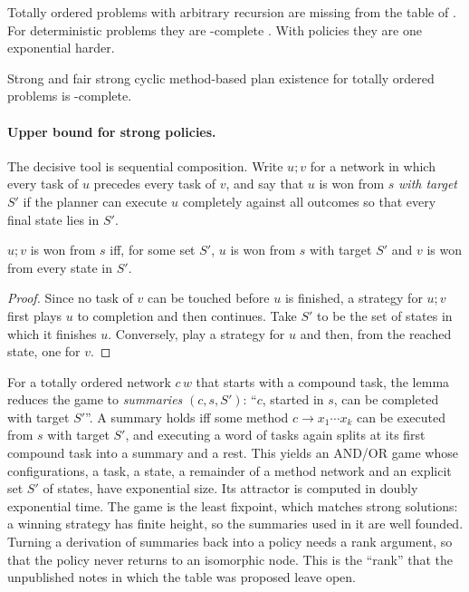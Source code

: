 Totally ordered problems with arbitrary recursion are missing from the table of \CBb{}. For
deterministic problems they are \EXPTIME-complete \parencite{alford:et:al:icaps-15}. With
policies they are one exponential harder.

\begin{theorem}\label{thm:to-arb}
  Strong and fair strong cyclic method-based plan existence for totally ordered problems is
  \TWOEXP-complete.
\end{theorem}

\paragraph{Upper bound for strong policies.}
The decisive tool is sequential composition. Write $u;v$ for a network in which every task of $u$
precedes every task of $v$, and say that $u$ is won from $s$ \emph{with target} $S'$ if the planner
can execute $u$ completely against all outcomes so that every final state lies in $S'$.

\begin{lemma}[composition]\label{lem:comp}
  $u;v$ is won from $s$ iff, for some set $S'$, $u$ is won from $s$ with target $S'$ and $v$ is won
  from every state in $S'$.
\end{lemma}

\begin{proof}
  Since no task of $v$ can be touched before $u$ is finished, a strategy for $u;v$ first plays $u$
  to completion and then continues. Take $S'$ to be the set of states in which it finishes $u$.
  Conversely, play a strategy for $u$ and then, from the reached state, one for $v$.
\end{proof}

For a totally ordered network $c\,w$ that starts with a compound task, the lemma reduces the game to
\emph{summaries} $(c,s,S')$: ``$c$, started in $s$, can be completed with target $S'$''. A summary
holds iff some method $c\to x_1\cdots x_k$ can be executed from $s$ with target $S'$, and executing a
word of tasks again splits at its first compound task into a summary and a rest. This yields an
AND/OR game whose configurations, a task, a state, a remainder of a method network and an explicit
set $S'$ of states, have exponential size. Its attractor is computed in doubly exponential time.
The game is the least fixpoint, which matches strong solutions: a winning strategy has finite height,
so the summaries used in it are well founded. Turning a derivation of summaries back into a policy
needs a rank argument, so that the policy never returns to an isomorphic node. This is the
``rank'' that the unpublished notes in which the table was proposed leave open.

